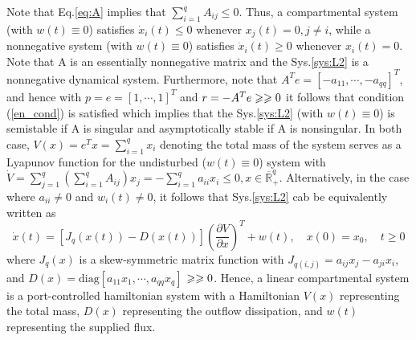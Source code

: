 \documentclass{paper}
\begin{document}
Note that Eq.\ref{eq:A} implies that $\sum_{i=1}^{q}A_{ij}\leqslant 0$. Thus, a compartmental system (with
$w(t)\equiv 0$) satisfies $\dot{x}_i(t)\leqslant 0$ whenever $x_j(t)=0,j\neq i$, while a nonnegative system 
(with $w(t)\equiv 0$) satisfies $\dot{x}_i(t)\geqslant 0$ whenever $x_i(t)=0$. Note that A is an essentially
nonnegative matrix and the Sys.\ref{sys:L2} is a nonnegative dynamical system. Furthermore, note that 
$A^Te=[-a_{11},\cdots,-a_{qq}]^T$, and hence with $p=e=[1,\cdots,1]^T$ and $r=-A^Te\geqslant\geqslant 0$ it follows that 
condition (\ref{en_cond}) is satisfied which implies that the Sys.\ref{sys:L2} (with $w(t)\equiv 0$) is semistable
if A is singular and asymptotically stable if A is nonsingular. In both case, $V(x)=e^Tx=\sum_{i=1}^{q}x_i$ denoting
the total mass of the system serves as a Lyapunov function for the undisturbed ($w(t)\equiv 0$)  system with
$\dot{V}=\sum_{j=1}^{q}(\sum_{i=1}^{q}A_{ij})x_j=-\sum_{i=1}^{q}a_{ii}x_i\leqslant 0, x\in \overline{\mathbb{R}}_{+}^{q}$.
Alternatively, in the case where $a_{ii}\neq 0$ and $w_i(t)\neq 0$, it follows that Sys.\ref{sys:L2} cab be equivalently
written as 
\begin{equation}
\dot{x}(t)=[J_q(x(t))-D(x(t))]\left(\frac{\partial V}{\partial x}\right)^T+w(t),\quad x(0)=x_0,\quad t\geqslant 0
\end{equation}
where $J_q(x)$ is a skew-symmetric matrix function with $J_{q(i,j)}=a_{ij}x_j-a_{ji}x_i$, and $D(x)=\text{diag}[a_{11}x_1,
\cdots,a_{qq}x_q]$ $\geqslant\geqslant 0$. Hence, a linear compartmental system is a port-controlled hamiltonian system with a Hamiltonian
$V(x)$ representing the total mass, $D(x)$ representing the outflow dissipation, and $w(t)$ representing the supplied flux. 
\end{document}
